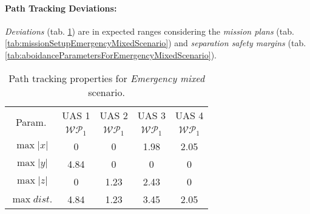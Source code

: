     \noindent\paragraph{Path Tracking Deviations:} \emph{Deviations} (tab. \ref{tab:pathTrackingParametersForEmergencyMixed}) are in expected ranges considering the \emph{mission plans} (tab. \ref{tab:missionSetupEmergencyMixedScenario}) and \emph{separation safety margins} (tab. \ref{tab:aboidanceParametersForEmergencyMixedScenario}).
    
    \begin{table}[H]
        \centering
        \begin{tabular}{c||c|c|c|c}
            \multirow{2}{*}{Param.} & UAS 1     & UAS 2             & UAS 3             & UAS 4 \\\cline{2-5}
                            & $\mathscr{WP}_1$  & $\mathscr{WP}_1$  & $\mathscr{WP}_1$  & $\mathscr{WP}_1$ \\\hline\hline
              $\max |x|$    & 0                 & 0                 & 1.98              & 2.05\\\hline
              $\max |y|$    & 4.84              & 0                 & 0                 & 0\\\hline
              $\max |z|$    & 0                 & 1.23              & 2.43              & 0\\\hline
              $\max dist.$  & 4.84              & 1.23              & 3.45              & 2.05\\
        \end{tabular}
        \caption{Path tracking properties for \emph{Emergency mixed} scenario.}
        \label{tab:pathTrackingParametersForEmergencyMixed}
    \end{table}    


